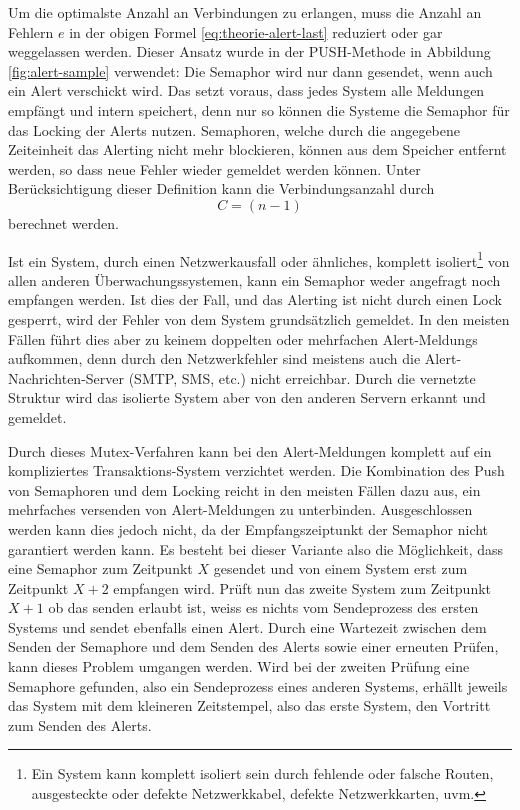 Um die optimalste Anzahl an Verbindungen zu erlangen, muss die Anzahl an Fehlern $e$ in der obigen Formel \ref{eq:theorie-alert-last} reduziert oder gar weggelassen werden. Dieser Ansatz wurde in der PUSH-Methode in Abbildung \ref{fig:alert-sample} verwendet: Die Semaphor wird nur dann gesendet, wenn auch ein Alert verschickt wird. Das setzt voraus, dass jedes System alle Meldungen empf\"angt und intern speichert, denn nur so k\"onnen die Systeme die Semaphor f\"ur das Locking der Alerts nutzen. Semaphoren, welche durch die angegebene Zeiteinheit das Alerting nicht mehr blockieren, k\"onnen aus dem Speicher entfernt werden, so dass neue Fehler wieder gemeldet werden k\"onnen. Unter Ber\"ucksichtigung dieser Definition kann die Verbindungsanzahl durch \begin{equation}
C = (n-1)
\label{eq:theorie-alert-optimal}
\end{equation}
berechnet werden.

Ist ein System, durch einen Netzwerkausfall oder \"ahnliches, komplett isoliert\footnote{Ein System kann komplett isoliert sein durch fehlende oder falsche Routen, ausgesteckte oder defekte Netzwerkkabel, defekte Netzwerkkarten, uvm.} von allen anderen \"Uberwachungssystemen, kann ein Semaphor weder angefragt noch empfangen werden. Ist dies der Fall, und das Alerting ist nicht durch einen Lock gesperrt, wird der Fehler von dem System grunds\"atzlich gemeldet. In den meisten F\"allen f\"uhrt dies aber zu keinem doppelten oder mehrfachen Alert-Meldungs aufkommen, denn durch den Netzwerkfehler sind meistens auch die Alert-Nachrichten-Server (SMTP, SMS, etc.) nicht erreichbar. Durch die vernetzte Struktur wird das isolierte System aber von den anderen Servern erkannt und gemeldet.

Durch dieses Mutex-Verfahren kann bei den Alert-Meldungen komplett auf ein kompliziertes Transaktions-System verzichtet werden. Die Kombination des Push von Semaphoren und dem Locking reicht in den meisten F\"allen dazu aus, ein mehrfaches versenden von Alert-Meldungen zu unterbinden. Ausgeschlossen werden kann dies jedoch nicht, da der Empfangszeiptunkt der Semaphor nicht garantiert werden kann. Es besteht bei dieser Variante also die M\"oglichkeit, dass eine Semaphor zum Zeitpunkt $X$ gesendet und von einem System erst zum Zeitpunkt $X + 2$ empfangen wird. Pr\"uft nun das zweite System zum Zeitpunkt $X+1$ ob das senden erlaubt ist, weiss es nichts vom Sendeprozess des ersten Systems und sendet ebenfalls einen Alert. Durch eine Wartezeit zwischen dem Senden der Semaphore und dem Senden des Alerts sowie einer erneuten Pr\"ufen, kann dieses Problem umgangen werden. Wird bei der zweiten Pr\"ufung eine Semaphore gefunden, also ein Sendeprozess eines anderen Systems, erh\"allt jeweils das System mit dem kleineren Zeitstempel, also das erste System, den Vortritt zum Senden des Alerts.


